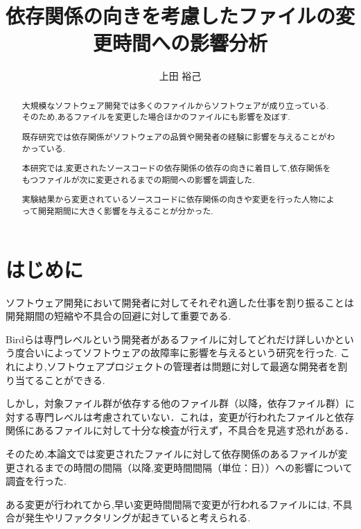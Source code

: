 \documentclass{fose2016}           %
\title{依存関係の向きを考慮したファイルの変更時間への影響分析}
\author{上田 裕己}{Ueda Yuki, 島根大学}
\begin{document}
\maketitle

\begin{abstract}
大規模なソフトウェア開発では多くのファイルからソフトウェアが成り立っている.
そのため,あるファイルを変更した場合ほかのファイルにも影響を及ぼす.

既存研究では依存関係がソフトウェアの品質や開発者の経験に影響を与えることがわかっている.

本研究では,変更されたソースコードの依存関係の依存の向きに着目して,依存関係をもつファイルが次に変更されるまでの期間への影響を調査した.
 
実験結果から変更されているソースコードに依存関係の向きや変更を行った人物によって開発期間に大きく影響を与えることが分かった.
  

\end{abstract}

\begin{eabstract}

\end{eabstract}

\section{はじめに} 
ソフトウェア開発において開発者に対してそれぞれ適した仕事を割り振ることは開発期間の短縮や不具合の回避に対して重要である.

Bird\cite{Bird}らは専門レベルという開発者があるファイルに対してどれだけ詳しいかという度合いによってソフトウェアの故障率に影響を与えるという研究を行った.
これにより,ソフトウェアプロジェクトの管理者は問題に対して最適な開発者を割り当てることができる.

しかし，対象ファイル群が依存する他のファイル群（以降，依存ファイル群）に対する専門レベルは考慮されていない．これは，変更が行われたファイルと依存関係にあるファイルに対して十分な検査が行えず，不具合を見逃す恐れがある．


そのため,本論文では変更されたファイルに対して依存関係のあるファイルが変更されるまでの時間の間隔（以降,変更時間間隔（単位：日））への影響について調査を行った.

ある変更が行われてから,早い変更時間間隔で変更が行われるファイルには, 不具合が発生やリファクタリングが起きていると考えられる.%
\end{document}
